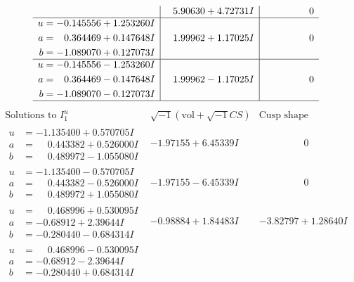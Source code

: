 \documentclass[1p]{elsarticle_modified}
\theoremstyle{definition}
\newcommand{\I}{\sqrt{-1}}
\begin{document}
$$\begin{array}{c|c|c}
 & \phantom{-}5.90630 + 4.72731 I & \phantom{-0.000000 } 0 \\ \hline\begin{aligned}
u &= -0.145556 + 1.253260 I \\
a &= \phantom{-}0.364469 + 0.147648 I \\
b &= -1.089070 + 0.127073 I\end{aligned}
 & \phantom{-}1.99962 + 1.17025 I & \phantom{-0.000000 } 0 \\ \hline\begin{aligned}
u &= -0.145556 - 1.253260 I \\
a &= \phantom{-}0.364469 - 0.147648 I \\
b &= -1.089070 - 0.127073 I\end{aligned}
 & \phantom{-}1.99962 - 1.17025 I & \phantom{-0.000000 } 0\\
 \hline 
 \end{array}$$\newpage$$\begin{array}{c|c|c}  
\text{Solutions to }I^u_{1}& \I (\text{vol} + \sqrt{-1}CS) & \text{Cusp shape}\\
 \hline 
\begin{aligned}
u &= -1.135400 + 0.570705 I \\
a &= \phantom{-}0.443382 + 0.526000 I \\
b &= \phantom{-}0.489972 - 1.055080 I\end{aligned}
 & -1.97155 + 6.45339 I & \phantom{-0.000000 } 0 \\ \hline\begin{aligned}
u &= -1.135400 - 0.570705 I \\
a &= \phantom{-}0.443382 - 0.526000 I \\
b &= \phantom{-}0.489972 + 1.055080 I\end{aligned}
 & -1.97155 - 6.45339 I & \phantom{-0.000000 } 0 \\ \hline\begin{aligned}
u &= \phantom{-}0.468996 + 0.530095 I \\
a &= -0.68912 + 2.39644 I \\
b &= -0.280440 - 0.684314 I\end{aligned}
 & -0.98884 + 1.84483 I & -3.82797 + 1.28640 I \\ \hline\begin{aligned}
u &= \phantom{-}0.468996 - 0.530095 I \\
a &= -0.68912 - 2.39644 I \\
b &= -0.280440 + 0.684314 I\end{aligned}

\end{array}$$
\end{document}
